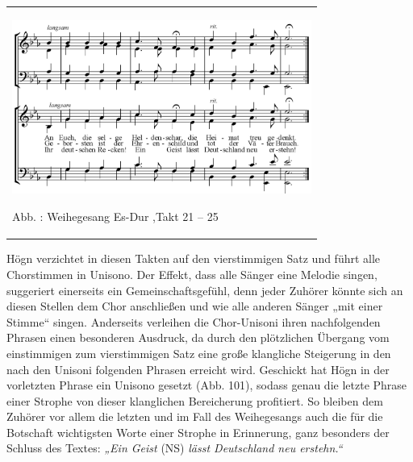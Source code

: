 \documentclass[a4paper]{article}
\newcommand\textstyleZitate[1]{\textit{#1}}
\newcounter{Abb}
\renewcommand\theAbb{\arabic{Abb}}
\begin{document}
\begin{center}
\tablefirsthead{}
\tablehead{}
\tabletail{}
\tablelasttail{}
\begin{supertabular}{m{10.009cm}}

\includegraphics[width=9.827cm,height=5.713cm]{pictures/zulassungsarbeit-img103.png}

\label{bkm:Ref100248086}Abb. \stepcounter{Abb}{\theAbb}: Weihegesang
Es-Dur ,Takt 21 – 25\\
\end{supertabular}
\end{center}
Högn verzichtet in diesen Takten auf den vierstimmigen Satz und führt
alle Chorstimmen in Unisono. Der Effekt, dass alle Sänger eine Melodie
singen, suggeriert einerseits ein Gemeinschaftsgefühl, denn jeder
Zuhörer könnte sich an diesen Stellen dem Chor anschließen und wie alle
anderen Sänger „mit einer Stimme“ singen. Anderseits verleihen die
Chor-Unisoni ihren nachfolgenden Phrasen einen besonderen Ausdruck, da
durch den plötzlichen Übergang vom einstimmigen zum vierstimmigen Satz
eine große klangliche Steigerung in den nach den Unisoni folgenden
Phrasen erreicht wird. Geschickt hat Högn in der vorletzten Phrase ein
Unisono gesetzt (Abb. 101), sodass genau die letzte Phrase einer
Strophe von dieser klanglichen Bereicherung profitiert. So bleiben dem
Zuhörer vor allem die letzten und im Fall des Weihegesangs auch die für
die Botschaft wichtigsten Worte einer Strophe in Erinnerung, ganz
besonders der Schluss des Textes: \textstyleZitate{„Ein Geist
}(NS)\textstyleZitate{ lässt Deutschland neu erstehn.“}
\end{document}
